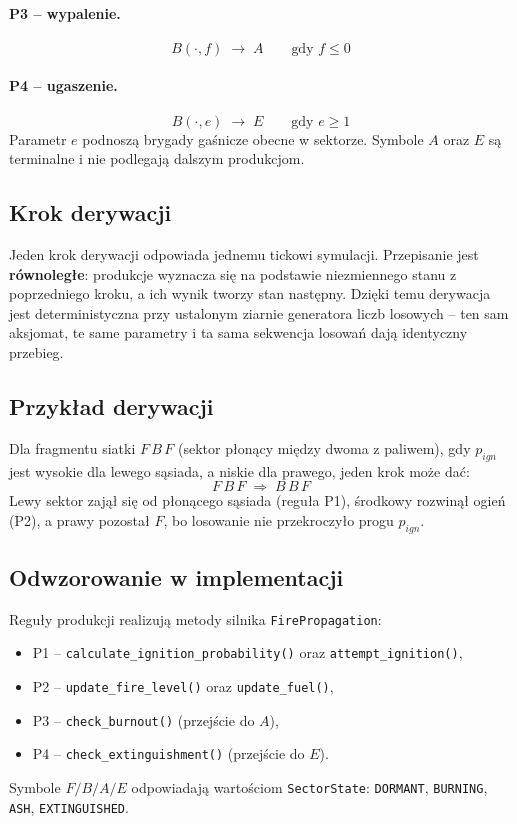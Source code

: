 \paragraph{P3 -- wypalenie.}
\begin{equation}
B(\cdot, f) \;\rightarrow\; A \qquad \text{gdy } f \le 0
\end{equation}

\paragraph{P4 -- ugaszenie.}
\begin{equation}
B(\cdot, e) \;\rightarrow\; E \qquad \text{gdy } e \ge 1
\end{equation}
Parametr $e$ podnoszą brygady gaśnicze obecne w sektorze. Symbole $A$ oraz $E$ są terminalne i nie podlegają dalszym produkcjom.

\subsection{Krok derywacji}

Jeden krok derywacji odpowiada jednemu tickowi symulacji. Przepisanie jest \textbf{równoległe}: produkcje wyznacza się na podstawie niezmiennego stanu z poprzedniego kroku, a ich wynik tworzy stan następny. Dzięki temu derywacja jest deterministyczna przy ustalonym ziarnie generatora liczb losowych -- ten sam aksjomat, te same parametry i ta sama sekwencja losowań dają identyczny przebieg.

\subsection{Przykład derywacji}

Dla fragmentu siatki $F\,B\,F$ (sektor płonący między dwoma z paliwem), gdy $p_{ign}$ jest wysokie dla lewego sąsiada, a niskie dla prawego, jeden krok może dać:
\begin{equation}
F\,B\,F \;\Longrightarrow\; B\,B\,F
\end{equation}
Lewy sektor zajął się od płonącego sąsiada (reguła P1), środkowy rozwinął ogień (P2), a prawy pozostał $F$, bo losowanie nie przekroczyło progu $p_{ign}$.

\subsection{Odwzorowanie w implementacji}

Reguły produkcji realizują metody silnika \texttt{FirePropagation}:
\begin{itemize}
  \item P1 -- \texttt{calculate\_ignition\_probability()} oraz \texttt{attempt\_ignition()},
  \item P2 -- \texttt{update\_fire\_level()} oraz \texttt{update\_fuel()},
  \item P3 -- \texttt{check\_burnout()} (przejście do $A$),
  \item P4 -- \texttt{check\_extinguishment()} (przejście do $E$).
\end{itemize}
Symbole $F/B/A/E$ odpowiadają wartościom \texttt{SectorState}: \texttt{DORMANT}, \texttt{BURNING}, \texttt{ASH}, \texttt{EXTINGUISHED}.

